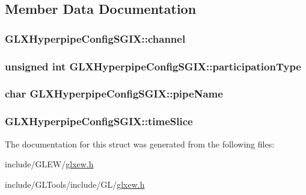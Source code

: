 \subsection{Member Data Documentation}
\hypertarget{struct_g_l_x_hyperpipe_config_s_g_i_x_abc812d8796ba89d5de4e33b3532d8335}{
\subsubsection[{channel}]{ G\-L\-X\-Hyperpipe\-Config\-S\-G\-I\-X\-::channel}}\label{struct_g_l_x_hyperpipe_config_s_g_i_x_abc812d8796ba89d5de4e33b3532d8335}
\hypertarget{struct_g_l_x_hyperpipe_config_s_g_i_x_a093cfaaec305531f66e1120929b5b01b}{
\subsubsection[{participation\-Type}]{\setlength{\rightskip}{0pt plus 5cm}unsigned {\bf int} G\-L\-X\-Hyperpipe\-Config\-S\-G\-I\-X\-::participation\-Type}}\label{struct_g_l_x_hyperpipe_config_s_g_i_x_a093cfaaec305531f66e1120929b5b01b}
\hypertarget{struct_g_l_x_hyperpipe_config_s_g_i_x_a35b03a5796f020067d0f463aa32a7c2d}{
\subsubsection[{pipe\-Name}]{\setlength{\rightskip}{0pt plus 5cm}char G\-L\-X\-Hyperpipe\-Config\-S\-G\-I\-X\-::pipe\-Name}}\label{struct_g_l_x_hyperpipe_config_s_g_i_x_a35b03a5796f020067d0f463aa32a7c2d}
\hypertarget{struct_g_l_x_hyperpipe_config_s_g_i_x_afe9288e75dc1ae5e0f33eff978d7024d}{
\subsubsection[{time\-Slice}]{ G\-L\-X\-Hyperpipe\-Config\-S\-G\-I\-X\-::time\-Slice}}\label{struct_g_l_x_hyperpipe_config_s_g_i_x_afe9288e75dc1ae5e0f33eff978d7024d}


The documentation for this struct was generated from the following files\-:\begin{DoxyCompactItemize}
\item 
include/\-G\-L\-E\-W/\hyperlink{_g_l_e_w_2glxew_8h}{glxew.\-h}\item 
include/\-G\-L\-Tools/include/\-G\-L/\hyperlink{_g_l_tools_2include_2_g_l_2glxew_8h}{glxew.\-h}\end{DoxyCompactItemize}
